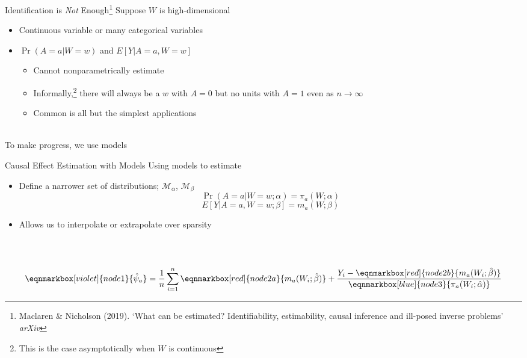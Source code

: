 \documentclass{beamer}
\begin{document}
\begin{frame}{Identification is \textit{Not} Enough\footnote[frame]{Maclaren \& Nicholson (2019). `What can be estimated? Identifiability, estimability, causal inference and ill-posed inverse problems' \textit{arXiv}}}
	Suppose $W$ is high-dimensional
	\begin{itemize}
		\item Continuous variable or many categorical variables
		\item $\Pr(A=a | W=w)$ and $E[Y | A=a, W=w]$
		\begin{itemize}
			\item Cannot nonparametrically estimate
			\item Informally,\footnote[frame]{This is the case asymptotically when $W$ is continuous} there will always be a $w$ with $A=0$ but no units with $A=1$ even as $n \rightarrow \infty$
			\item Common is all but the simplest applications 
		\end{itemize}
	\end{itemize}~\\
	To make progress, we use models
\end{frame}

\begin{frame}{Causal Effect Estimation with Models}
	Using models to estimate 
	\begin{itemize}
		\item Define a narrower set of distributions; $\mathcal{M}_\alpha$, $\mathcal{M}_\beta$
		\[\Pr(A=a | W=w; \alpha) = \pi_a(W; \alpha)\]
		\[E[Y | A=a, W=w; \beta] = m_a(W; \beta)\]
		\item Allows us to interpolate or extrapolate over sparsity
	\end{itemize}~\\~\\
	\begin{equation*}
		\eqnmarkbox[violet]{node1}{\hat{\psi}_a}
		=
		\frac{1}{n}
		\sum_{i=1}^{n}
		\eqnmarkbox[red]{node2a}{m_a(W_i; \hat{\beta})}
		+ 
		\frac{Y_i - 
			\eqnmarkbox[red]{node2b}{m_a(W_i; \hat{\beta})}}{
			\eqnmarkbox[blue]{node3}{\pi_a(W_i; \hat{\alpha})}
		}
	\end{equation*}
\end{frame}
\end{document}
